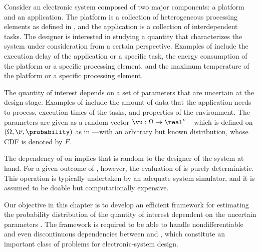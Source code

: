 Consider an electronic system composed of two major components: a platform and
an application. The platform is a collection of heterogeneous processing
elements as defined in , and the application is a collection
of interdependent tasks. The designer is interested in studying a quantity \g
that characterizes the system under consideration from a certain perspective.
Examples of \g include the execution delay of the application or a specific
task, the energy consumption of the platform or a specific processing element,
and the maximum temperature of the platform or a specific processing element.

The quantity of interest \g depends on a set of parameters \vu that are
uncertain at the design stage. Examples of \vu include the amount of data that
the application needs to process, execution times of the tasks, and properties
of the environment. The parameters \vu are given as a random vector $\vu: \Omega
\to \real^\nu$---which is defined on $(\Omega, \F, \probability)$ as in
---with an arbitrary but known distribution, whose
\ac{CDF} is denoted by $F$.

The dependency of \g on \vu implies that \g is random to the designer of the
system at hand. For a given outcome of \vu, however, the evaluation of \g is
purely deterministic. This operation is typically undertaken by an adequate
system simulator, and it is assumed to be doable but computationally expensive.

Our objective in this chapter is to develop an efficient framework for
estimating the probability distribution of the quantity of interest \g dependent
on the uncertain parameters \vu. The framework is required to be able to handle
nondifferentiable and even discontinuous dependencies between \g and \vu, which
constitute an important class of problems for electronic-system design.
